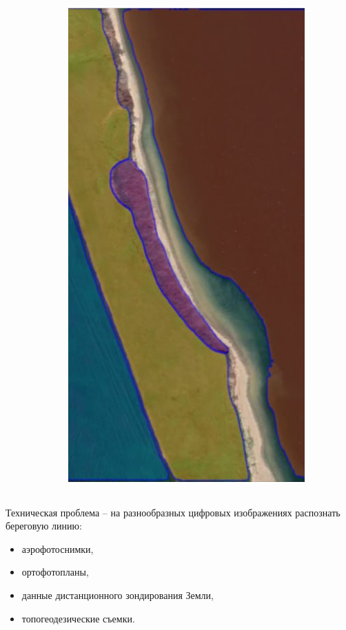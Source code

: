 \documentclass[handout]{beamer}
\begin{document}
\begin{frame}
\begin{columns}
\begin{column}{0.25\linewidth}
    \end{column}
    \begin{column}{0.25\linewidth}
      \includegraphics[width=1\linewidth]{sa-source-ge.png}
    \end{column}
  \end{columns}
  Техническая проблема -- на разнообразных цифровых изображениях распознать береговую линию:
  \begin{itemize}
  \item аэрофотоснимки,
  \item ортофотопланы,
  \item данные дистанционного зондирования Земли,
  \item топогеодезические съемки.
  \end{itemize}
\end{frame}
\end{document}

